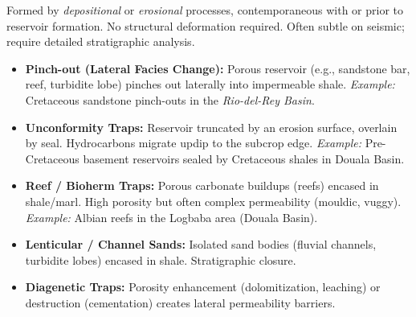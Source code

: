 \documentclass[11pt]{article}
\begin{document}
Formed by \emph{depositional} or \emph{erosional} processes, contemporaneous with or prior to reservoir formation. No structural deformation required. Often subtle on seismic; require detailed stratigraphic analysis.

\begin{itemize}
    \item \textbf{Pinch-out (Lateral Facies Change):} Porous reservoir (e.g., sandstone bar, reef, turbidite lobe) pinches out laterally into impermeable shale. \emph{Example:} Cretaceous sandstone pinch-outs in the \emph{Rio-del-Rey Basin}.
    \item \textbf{Unconformity Traps:} Reservoir truncated by an erosion surface, overlain by seal. Hydrocarbons migrate updip to the subcrop edge. \emph{Example:} Pre-Cretaceous basement reservoirs sealed by Cretaceous shales in Douala Basin.
    \item \textbf{Reef / Bioherm Traps:} Porous carbonate buildups (reefs) encased in shale/marl. High porosity but often complex permeability (mouldic, vuggy). \emph{Example:} Albian reefs in the Logbaba area (Douala Basin).
    \item \textbf{Lenticular / Channel Sands:} Isolated sand bodies (fluvial channels, turbidite lobes) encased in shale. Stratigraphic closure.
    \item \textbf{Diagenetic Traps:} Porosity enhancement (dolomitization, leaching) or destruction (cementation) creates lateral permeability barriers.
\end{itemize}
\end{document}
